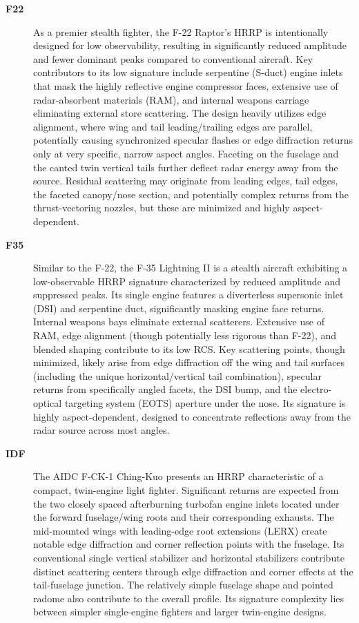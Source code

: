 {\begin{description}
    \item[\textbf{F22}]
    As a premier stealth fighter, the F-22 Raptor's HRRP is intentionally designed for low observability, resulting in significantly reduced amplitude and fewer dominant peaks compared to conventional aircraft. Key contributors to its low signature include serpentine (S-duct) engine inlets that mask the highly reflective engine compressor faces, extensive use of radar-absorbent materials (RAM), and internal weapons carriage eliminating external store scattering. The design heavily utilizes edge alignment, where wing and tail leading/trailing edges are parallel, potentially causing synchronized specular flashes or edge diffraction returns only at very specific, narrow aspect angles. Faceting on the fuselage and the canted twin vertical tails further deflect radar energy away from the source. Residual scattering may originate from leading edges, tail edges, the faceted canopy/nose section, and potentially complex returns from the thrust-vectoring nozzles, but these are minimized and highly aspect-dependent.

    \item[\textbf{F35}]
    Similar to the F-22, the F-35 Lightning II is a stealth aircraft exhibiting a low-observable HRRP signature characterized by reduced amplitude and suppressed peaks. Its single engine features a diverterless supersonic inlet (DSI) and serpentine duct, significantly masking engine face returns. Internal weapons bays eliminate external scatterers. Extensive use of RAM, edge alignment (though potentially less rigorous than F-22), and blended shaping contribute to its low RCS. Key scattering points, though minimized, likely arise from edge diffraction off the wing and tail surfaces (including the unique horizontal/vertical tail combination), specular returns from specifically angled facets, the DSI bump, and the electro-optical targeting system (EOTS) aperture under the nose. Its signature is highly aspect-dependent, designed to concentrate reflections away from the radar source across most angles.

    \item[\textbf{IDF}]
    The AIDC F-CK-1 Ching-Kuo presents an HRRP characteristic of a compact, twin-engine light fighter. Significant returns are expected from the two closely spaced afterburning turbofan engine inlets located under the forward fuselage/wing roots and their corresponding exhausts. The mid-mounted wings with leading-edge root extensions (LERX) create notable edge diffraction and corner reflection points with the fuselage. Its conventional single vertical stabilizer and horizontal stabilizers contribute distinct scattering centers through edge diffraction and corner effects at the tail-fuselage junction. The relatively simple fuselage shape and pointed radome also contribute to the overall profile. Its signature complexity lies between simpler single-engine fighters and larger twin-engine designs.


\end{description}}
